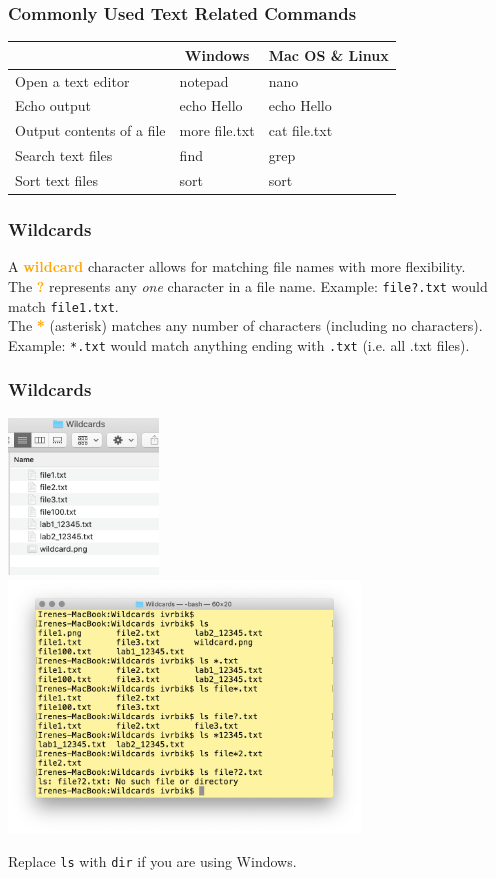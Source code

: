 \documentclass[xcolor=svgnames, colorlinks, handout]{beamer}
\newcommand{\nl}{\\[1em]}
\newcommand{\define}[1]{\textbf{\textcolor{orange}{#1}}}
\newcommand{\ft}[1]{\frametitle{#1}}
\begin{document}
\begin{frame}\ft{Commonly Used Text Related Commands}
\begin{tabular}{|l|l |l |}
\hline
&\multicolumn{1}{c|}{\bf Windows} & \multicolumn{1}{c|}{\bf Mac OS \& Linux}\\
\hline 
Open a text editor
& notepad
& nano\\
Echo output
& echo Hello
& echo Hello\\
Output contents of a file
& more file.txt
& cat file.txt\\
Search text files
& find
& grep\\
Sort text files
& sort 
& sort \\
\hline
\end{tabular}
\end{frame}

\begin{frame}[fragile]\ft{Wildcards}
A \define{wildcard} character allows for matching file names with more flexibility.\nl

The \define{?} represents any \emph{one} character in a file name. 
Example:  \verb|file?.txt| would match \verb|file1.txt|.\nl


The \define{*} (asterisk) matches any number of characters (including no characters). 
Example: \verb|*.txt| would match anything ending with \verb|.txt| (i.e. all .txt files).

\end{frame}


\begin{frame}[fragile]\ft{Wildcards}
\includegraphics[width=0.3\textwidth]{img/files.png}
\includegraphics[width=0.7\textwidth]{img/wildcards.png}

Replace {\tt ls} with {\tt dir} if you are using Windows.
\end{frame}
\end{document}
